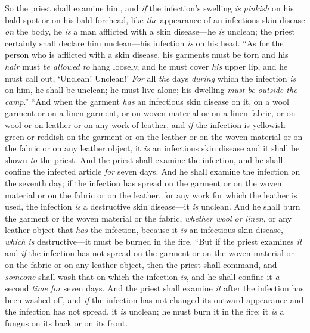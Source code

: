 \begin{biblechapter}
\verse So the priest shall examine him, and \textit{if} the infection’s swelling \textit{is} \textit{pinkish} on his bald spot or on his bald forehead, like \textit{the} appearance of an infectious skin disease \textit{on} the body,
\verse he \textit{is} a man afflicted with a skin disease—he \textit{is} unclean; the priest certainly shall declare him unclean—his infection \textit{is} on his head.
\verse “As for the person who is afflicted with a skin disease, his garments must be torn and his \textit{hair} must \textit{be allowed to} hang loosely, and he must cover \textit{his} upper lip, and he must call out, ‘Unclean! Unclean!’
\verse \textit{For} all \textit{the} days \textit{during} which the infection \textit{is} on him, he shall be unclean; he must live alone; his dwelling \textit{must be} \textit{outside the camp}.”
 “And when the garment \textit{has} an infectious skin disease on it, on a wool garment or on a linen garment,
\verse or on woven material or on a linen fabric, or on wool or on leather or on any work of leather,
\verse and \textit{if} the infection is yellowish green or reddish on the garment or on the leather or on the woven material or on the fabric or on any leather object, it \textit{is} an infectious skin disease and it shall be shown \textit{to} the priest.
\verse And the priest shall examine the infection, and he shall confine the infected article \textit{for} seven days.
\verse And he shall examine the infection on the seventh day; if the infection has spread on the garment or on the woven material or on the fabric or on the leather, for any work for which the leather is used, the infection \textit{is} a destructive skin disease—it \textit{is} unclean.
\verse And he shall burn the garment or the woven material or the fabric, \textit{whether wool or linen}, or any leather object that \textit{has} the infection, because it \textit{is} an infectious skin disease, \textit{which is} destructive—it must be burned in the fire.
\verse “But if the priest examines \textit{it} and \textit{if} the infection has not spread on the garment or on the woven material or on the fabric or on any leather object,
\verse then the priest shall command, and \textit{someone} shall wash that on which the infection \textit{is}, and he shall confine it \textit{a} second \textit{time} \textit{for} seven days.
\verse And the priest shall examine \textit{it} after the infection has been washed off, and \textit{if} the infection has not changed its outward appearance and the infection has not spread, it \textit{is} unclean; he must burn it in the fire; it \textit{is} a fungus on its back or on its front.

\end{biblechapter}

